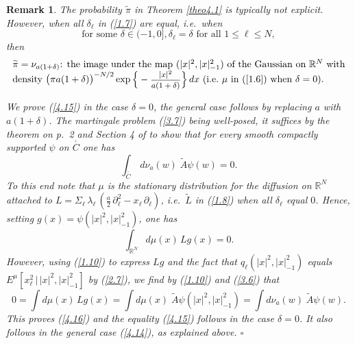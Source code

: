\documentclass[12pt,leqno]{article}
\def\IR{{\mathbb R}}
\def\n{\noindent}
\def\dis{\displaystyle}
\def\f{\footnotesize}
\def\wt{\widetilde}
\newtheorem{remark}[theorem]{Remark}
\begin{document}
\begin{remark}\label{rem4.5} \rm The probability $\wt{\pi}$ in Theorem \ref{theo4.1} is typically not explicit. However, when all $\delta_\ell$ in (\ref{1.7}) are equal, i.e.~when
\begin{equation}\label{4.14}
\mbox{for some $\delta \in (-1,0], \delta_\ell = \delta$ for all $1 \le \ell \le N$},
\end{equation}
then
\begin{equation}\label{4.15}
\begin{array}{l}
\mbox{$\wt{\pi} = \nu_{a(1 + \delta)}$: the image under the map $(|x|^2, |x|^2_{-1})$ of the Gaussian on $\IR^N$ with}
\\
\mbox{density $\big(\pi a(1 + \delta)\big)^{-N/2} \exp \Big\{- \mbox{\f $\dis\frac{|x|^2}{a(1 + \delta)}$} \Big\} \, dx$ (i.e.~$\mu$ in (\ref{1.6}) when $\delta = 0$).}
\end{array}
\end{equation}

\n
We prove (\ref{4.15}) in the case $\delta = 0$, the general case follows by replacing $a$ with $a(1 + \delta)$. The martingale problem (\ref{3.7}) being well-posed, it suffices by the theorem on p.~2 and Section 4 of \cite{Eche82} to show that for every smooth compactly supported $\psi$ on $\stackrel{_\circ}{C}$ one has
\begin{equation}\label{4.16}
\dis\int_{\stackrel{_\circ}{C}}\,d\nu_a(w) \; \wt{A} \psi (w) = 0.
\end{equation}
To this end note that $\mu$ is the stationary distribution for the diffusion on $\IR^N$ attached to $L = \Sigma_\ell \, \lambda_\ell \, (\frac{a}{2} \, \partial^2_\ell - x_\ell\,\partial_\ell)$, i.e.~$\wt{L}$ in (\ref{1.8}) when all $\delta_\ell$ equal $0$. Hence, setting $g(x) = \psi(|x|^2, |x|^2_{-1})$, one has
\begin{equation}\label{4.17}
\dis\int_{\IR^N} d \mu(x) \, Lg(x) = 0 .
\end{equation}
However, using (\ref{1.10}) to express $Lg$ and the fact that $q_\ell(|x|^2,|x|^2_{-1})$ equals $E^\mu[x^2_\ell \, \big| \, |x|^2, |x|^2_{-1}]$ by (\ref{2.7}), we find by (\ref{1.10}) and (\ref{3.6}) that
\begin{equation}\label{4.18}
0 = \dis\int d\mu(x) \, Lg(x) = \dis\int  d\mu(x) \; \wt{A} \psi ( |x|^2, |x|^2_{-1}) = \dis\int d \nu_a(w) \; \wt{A} \psi(w).
\end{equation}
This proves (\ref{4.16}) and the equality (\ref{4.15}) follows in the case $\delta = 0$. It also follows in the general case (\ref{4.14}), as explained above. \hfill $\square$
\end{remark}
\end{document}
